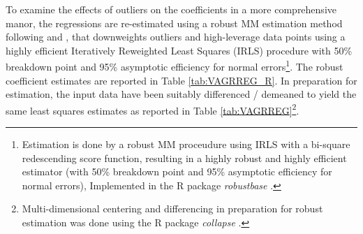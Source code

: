 \documentclass[a4paper]{article}
\begin{document}
To examine the effects of outliers on the coefficients in a more comprehensive manor, the regressions are re-estimated using a robust MM estimation method following \citet{yohai1987high} and \citet{koller2011sharpening}, that downweights outliers and high-leverage data points using a highly efficient Iteratively Reweighted Least Squares (IRLS) procedure with 50\% breakdown point and 95\% asymptotic efficiency for normal errors\footnote{Estimation is done by a robust MM proceudure using IRLS with a bi-square redescending score function, resulting in a highly robust and highly efficient estimator (with 50\% breakdown point and 95\% asymptotic efficiency for normal errors), Implemented in the R package \textit{robustbase} \citep{rousseeuw2009robustbase}.}. The robust coefficient estimates are reported in Table \ref{tab:VAGRREG_R}. In preparation for estimation, the input data have been suitably differenced / demeaned to yield the same least squares estimates as reported in Table \ref{tab:VAGRREG}\footnote{Multi-dimensional centering and differencing in preparation for robust estimation was done using the R package \textit{collapse} \citep{collapse2021}.}. 
\end{document}
